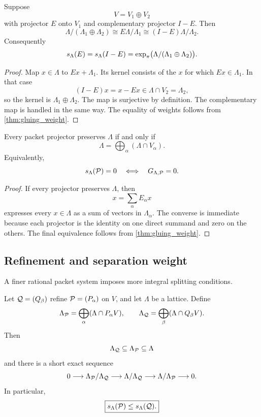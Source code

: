 \begin{corollary}\label{cor:binary_gluing}
Suppose
\[
V=V_1\oplus V_2
\]
with projector $E$ onto $V_1$ and complementary projector $I-E$.  Then
\[
\Lambda/(\Lambda_1\oplus\Lambda_2)
\cong
E\Lambda/\Lambda_1
\cong
(I-E)\Lambda/\Lambda_2.
\]
Consequently
\[
s_\Lambda(E)=s_\Lambda(I-E)
=
\operatorname{exp}_\pi\bigl(\Lambda/(\Lambda_1\oplus\Lambda_2)\bigr).
\]
\end{corollary}

\begin{proof}
Map $x\in\Lambda$ to $Ex+\Lambda_1$.  Its kernel consists of the $x$ for which $Ex\in\Lambda_1$.  In that case
\[
(I-E)x=x-Ex\in\Lambda\cap V_2=\Lambda_2,
\]
so the kernel is $\Lambda_1\oplus\Lambda_2$.  The map is surjective by definition.  The complementary map is handled in the same way.  The equality of weights follows from \cref{thm:gluing_weight}.
\end{proof}

\begin{corollary}\label{cor:integral_split}
Every packet projector preserves $\Lambda$ if and only if
\[
\Lambda=\bigoplus_\alpha(\Lambda\cap V_\alpha).
\]
Equivalently,
\[
s_\Lambda(\mathcal P)=0
\quad\Longleftrightarrow\quad
G_{\Lambda,\mathcal P}=0.
\]
\end{corollary}

\begin{proof}
If every projector preserves $\Lambda$, then
\[
x=\sum_\alpha E_\alpha x
\]
expresses every $x\in\Lambda$ as a sum of vectors in $\Lambda_\alpha$.  The converse is immediate because each projector is the identity on one direct summand and zero on the others.  The final equivalence follows from \cref{thm:gluing_weight}.
\end{proof}

\subsection{Refinement and separation weight}

A finer rational packet system imposes more integral splitting conditions.

\begin{theorem}\label{thm:gluing_refinement}
Let $\mathcal Q=(Q_\beta)$ refine $\mathcal P=(P_\alpha)$ on $V$, and let $\Lambda$ be a lattice.  Define
\[
\Lambda_{\mathcal P}
=
\bigoplus_\alpha(\Lambda\cap P_\alpha V),
\qquad
\Lambda_{\mathcal Q}
=
\bigoplus_\beta(\Lambda\cap Q_\beta V).
\]
Then
\[
\Lambda_{\mathcal Q}\subseteq\Lambda_{\mathcal P}\subseteq\Lambda
\]
and there is a short exact sequence
\[
0
\longrightarrow
\Lambda_{\mathcal P}/\Lambda_{\mathcal Q}
\longrightarrow
\Lambda/\Lambda_{\mathcal Q}
\longrightarrow
\Lambda/\Lambda_{\mathcal P}
\longrightarrow0.
\]
In particular,
\[
\boxed{
s_\Lambda(\mathcal P)\leq s_\Lambda(\mathcal Q).
}
\]
\end{theorem}

